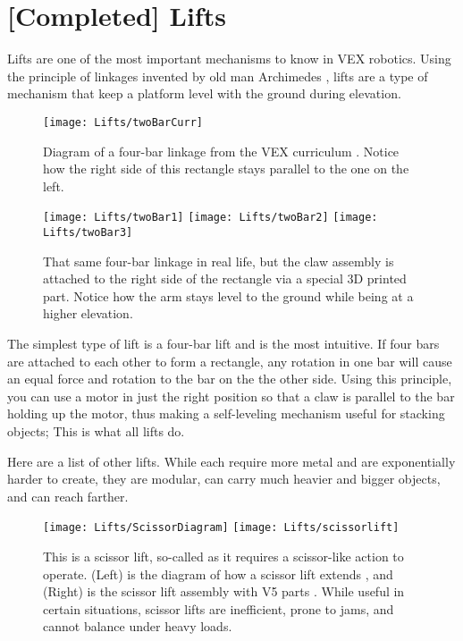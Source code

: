 \section{[Completed] Lifts}

Lifts are one of the most important mechanisms to know in VEX robotics. Using the principle of linkages invented by old man Archimedes \cite{Linkage}, lifts are a type of mechanism that keep a platform level with the ground during elevation.

\begin{figure}[h]
    \centering
    \texttt{[image: Lifts/twoBarCurr]}
    \caption{
    Diagram of a four-bar linkage from the VEX curriculum \cite{LinkageCurr}. Notice how the right side of this rectangle stays parallel to the one on the left.
    }
\end{figure}

\begin{figure}[h]
    \centering
    \texttt{[image: Lifts/twoBar1]}
    \texttt{[image: Lifts/twoBar2]}
    \texttt{[image: Lifts/twoBar3]}
    \caption{
    That same four-bar linkage in real life, but the claw assembly is attached to the right side of the rectangle via a special 3D printed part. Notice how the arm stays level to the ground while being at a higher elevation.
    }
\end{figure}

The simplest type of lift is a four-bar lift and is the most intuitive. If four bars are attached to each other to form a rectangle, any rotation in one bar will cause an equal force and rotation to the bar on the the other side. Using this principle, you can use a motor in just the right position so that a claw is parallel to the bar holding up the motor, thus making a self-leveling mechanism useful for stacking objects; This is what all lifts do.

Here are a list of other lifts. While each require more metal and are exponentially harder to create, they are modular, can carry much heavier and bigger objects, and can reach farther.


\begin{figure}[h]
    \centering
    \texttt{[image: Lifts/ScissorDiagram]}
    \texttt{[image: Lifts/scissorlift]}
    \caption{
    This is a scissor lift, so-called as it requires a scissor-like action to operate. (Left) is the diagram of how a scissor lift extends \cite{ScissorDiagram}, and (Right) is the scissor lift assembly with V5 parts \cite{V5Lifts}. While useful in certain situations, scissor lifts are inefficient, prone to jams, and cannot balance under heavy loads.
    }
\end{figure}


